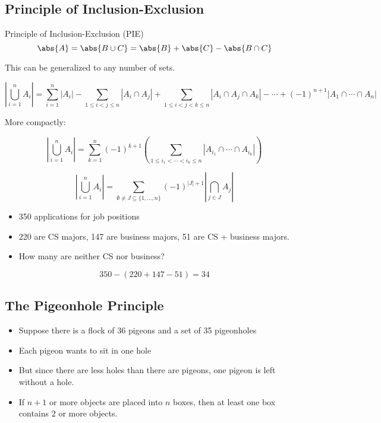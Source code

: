 \documentclass{scrreprt}
\begin{document}
\subsection{Principle of Inclusion-Exclusion}

\begin{definition}{Principle of Inclusion-Exclusion (PIE)}
    \[
        \abs{A} = \abs{B\cup C} = \abs{B} + \abs{C} - \abs{B \cap C}
    \]

    This can be generalized to any number of sets.

    \[
        \left|\bigcup_{i=1}^n A_i\right| = \sum_{i=1}^n |A_i| - \sum_{1 \leqslant i < j \leqslant n} |A_i\cap A_j| + \sum_{1 \leqslant i < j < k \leqslant n} |A_i \cap A_j\cap A_k| - \cdots + (-1)^{n+1} \left|A_1\cap\cdots\cap A_n\right|
    \]

    More compactly:

    \[
        \left|\bigcup_{i=1}^n A_i\right| = \sum_{k=1}^n (-1)^{k+1} \left( \sum_{1 \leqslant i_1 < \cdots < i_k \leqslant n} | A_{i_1} \cap \cdots \cap A_{i_k} | \right)
    \]

    \[
        \left| \bigcup_{i=1}^n A_i\right| = \sum_{\emptyset\neq J\subseteq\{1,\ldots,n\}}(-1)^{|J|+1} \left |\bigcap_{j\in J} A_j\right|
    \]
\end{definition}

\begin{example}
    \begin{itemize}
        \item 350 applications for job positions
        \item 220 are CS majors, 147 are business majors, 51 are CS + business majors.
        \item How many are neither CS nor business?
    \end{itemize}

    \[
        350 - (220 + 147 - 51) = 34
    \]
\end{example}

\subsection{The Pigeonhole Principle}
\begin{itemize}
    \item Suppose there is a flock of 36 pigeons and a set of 35 pigeonholes
    \item Each pigeon wants to sit in one hole
    \item But since there are less holes than there are pigeons, one pigeon is
          left without a hole.
    \item If $n+1$ or more objects are placed into $n$ boxes, then at least one box contains
          $2$ or more objects.
\end{itemize}
\end{document}
